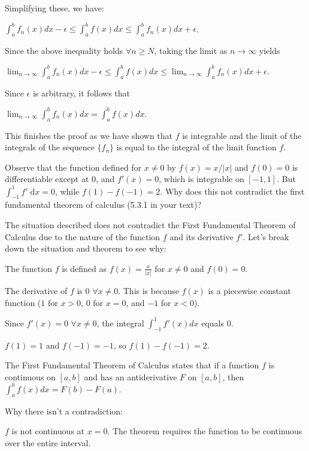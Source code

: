 \documentclass[answers]{exam}
\theoremstyle{remark}
\theoremstyle{definition}
\newcommand{\dx}{\;\mathrm{d}x}
\begin{document}
\begin{questions}
\begin{solution}
Simplifying these, we have:

$\int_{a}^{b} f_n(x) dx - \epsilon \leq \int_{a}^{b} f(x) dx \leq \int_{a}^{b} f_n(x) dx + \epsilon$.

Since the above inequality holds $\forall n \geq N$, taking the limit as
$n \to \infty$ yields

$\lim_{n \to \infty} \int_{a}^{b} f_n(x) dx - \epsilon \leq \int_{a}^{b} f(x) dx \leq \lim_{n \to \infty} \int_{a}^{b} f_n(x) dx + \epsilon$.

Since $\epsilon$ is arbitrary, it follows that

$\lim_{n \to \infty} \int_{a}^{b} f_n(x) dx = \int_{a}^{b} f(x) dx$.

This finishes the proof as we have shown that $f$ is integrable and the limit
of the integrals of the sequence $\{f_n\}$ is equal to the integral of
the limit function $f$.

\end{solution}


\question[4] Observe that the function defined for $x \not=0$ by $f(x)=x/|x|$ and $f(0)=0$ is differentiable except at $0$, and $f'(x)=0$, which is integrable on $[-1,1]$. But $\int_{-1}^1 f' \dx =0$, while $f(1)-f(-1)=2$. Why does this not contradict the first fundamental theorem of calculus (5.3.1 in your text)?

\begin{solution}

The situation described does not contradict the First Fundamental Theorem of
Calculus due to the nature of the function $f$ and its derivative $f'$. Let's
break down the situation and theorem to see why:

The function $f$ is defined as $f(x) = \frac{x}{|x|}$ for $x \neq 0$
and $f(0) = 0$.

The derivative of $f$ is $0$ $\forall x \neq 0$. This is because $f(x)$ is a piecewise
constant function ($1$ for $x > 0$, $0$ for $x = 0$, and $-1$ for $x < 0$).

Since $f'(x) = 0$ $\forall x \neq 0$, the integral $\int_{-1}^{1} f'(x) dx$ equals $0$.

$f(1) = 1$ and $f(-1) = -1$, so $f(1) - f(-1) = 2$.

The First Fundamental Theorem of Calculus states that if a function $f$ is
continuous on $[a, b]$ and has an antiderivative $F$ on $[a, b]$, then
$\int_{a}^{b} f(x) dx = F(b) - F(a)$.

Why there isn't a contradiction:

$f$ is not continuous at $x = 0$. The theorem requires the function to be continuous
over the entire interval.


\end{solution}
\end{questions}
\end{document}
